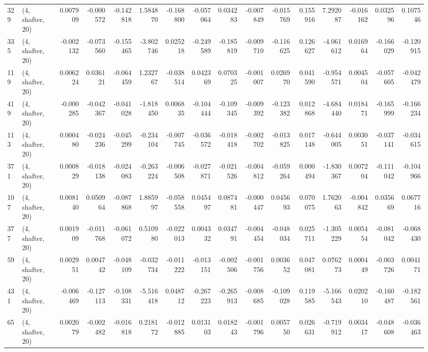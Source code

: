 \begin{tabular}{llrrrrrrrrrrrrrr}
329 &  (4, shafter, 20) &   0.007909 & -0.000572 & -0.142818 &    1.584870 & -0.168800 &  -0.057064 &  0.034283 & -0.007849 & -0.015769 &  0.155916 &     7.292087 & -0.016162 &  0.032596 &  0.107546 \\
335 &  (4, shafter, 20) &  -0.002132 & -0.073560 & -0.155465 &   -3.802746 &  0.025218 &  -0.249589 & -0.185819 & -0.009710 & -0.116625 &  0.126627 &    -4.061612 &  0.016964 & -0.166029 & -0.120915 \\
119 &  (4, shafter, 20) &   0.006224 &  0.036121 & -0.064459 &    1.232767 & -0.038514 &   0.042369 &  0.070325 & -0.001007 &  0.026970 &  0.041590 &    -0.954571 &  0.004504 & -0.057605 & -0.042479 \\
419 &  (4, shafter, 20) &  -0.000285 & -0.042367 & -0.041028 &   -1.818450 &  0.006835 &  -0.104444 & -0.109345 & -0.009392 & -0.123382 &  0.012868 &    -4.684440 &  0.018471 & -0.165999 & -0.166234 \\
113 &  (4, shafter, 20) &   0.000480 & -0.024236 & -0.045299 &   -0.234104 & -0.007745 &  -0.036572 & -0.018418 & -0.002702 & -0.013825 &  0.017148 &    -0.644005 &  0.003051 & -0.037141 & -0.034615 \\
371 &  (4, shafter, 20) &   0.000829 & -0.018138 & -0.024083 &   -0.263224 & -0.006508 &  -0.027871 & -0.021526 & -0.004812 & -0.059264 &  0.000494 &    -1.830367 &  0.007204 & -0.111042 & -0.104966 \\
107 &  (4, shafter, 20) &   0.008140 &  0.050964 & -0.087868 &    1.885997 & -0.058558 &   0.045497 &  0.087481 & -0.000447 &  0.045693 &  0.070075 &     1.762063 & -0.004842 &  0.035669 &  0.067716 \\
377 &  (4, shafter, 20) &   0.001909 & -0.011768 & -0.061072 &    0.510980 & -0.022013 &   0.004332 &  0.034791 & -0.004454 & -0.048034 &  0.025711 &    -1.305229 &  0.005454 & -0.081042 & -0.068430 \\
59  &  (4, shafter, 20) &   0.002951 &  0.004742 & -0.048109 &   -0.032734 & -0.011222 &  -0.013151 & -0.002506 & -0.001756 &  0.003652 &  0.047081 &     0.076273 &  0.000449 & -0.003726 &  0.004171 \\
431 &  (4, shafter, 20) &  -0.006469 & -0.127113 & -0.108331 &   -5.516418 &  0.048712 &  -0.267223 & -0.265913 & -0.008685 & -0.109028 &  0.119585 &    -5.166543 &  0.020210 & -0.160487 & -0.182561 \\
65  &  (4, shafter, 20) &   0.002079 & -0.002482 & -0.016818 &    0.218172 & -0.012885 &   0.013103 &  0.018243 & -0.001796 &  0.005750 &  0.026631 &    -0.719912 &  0.003417 & -0.048608 & -0.036463 \\

\end{tabular}
